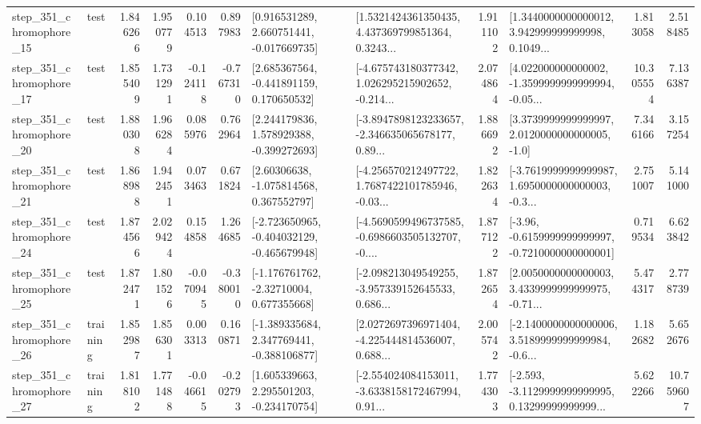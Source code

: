 \begin{tabular}{llrrrrllrlrr}
  step\_351\_chromophore\_15 &      test &      1.846266 &    1.950779 &      0.104513 &  0.897983 &    [0.916531289, 2.660751441, -0.017669735] &  [1.5321424361350435, 4.437369799851364, 0.3243... &       1.911102 &  [1.3440000000000012, 3.942999999999998, 0.1049... &            1.813058 &          2.518485 \\
  step\_351\_chromophore\_17 &      test &      1.855409 &    1.731291 &     -0.124118 & -0.767310 &    [2.685367564, -0.441891159, 0.170650532] &  [-4.675743180377342, 1.026295215902652, -0.214... &       2.074864 &  [4.022000000000002, -1.3599999999999994, -0.05... &           10.305554 &          7.136387 \\
  step\_351\_chromophore\_20 &      test &      1.880308 &    1.966284 &      0.085976 &  0.762964 &    [2.244179836, 1.578929388, -0.399272693] &  [-3.8947898123233657, -2.346635065678177, 0.89... &       1.886692 &     [3.3739999999999997, 2.0120000000000005, -1.0] &            7.346166 &          3.157254 \\
  step\_351\_chromophore\_21 &      test &      1.868988 &    1.942451 &      0.073463 &  0.671824 &     [2.60306638, -1.075814568, 0.367552797] &  [-4.256570212497722, 1.7687422101785946, -0.03... &       1.822634 &  [-3.7619999999999987, 1.6950000000000003, -0.3... &            2.751007 &          5.141000 \\
  step\_351\_chromophore\_24 &      test &      1.874566 &    2.029424 &      0.154858 &  1.264685 &  [-2.723650965, -0.404032129, -0.465679948] &  [-4.5690599496737585, -0.6986603505132707, -0.... &       1.877122 &  [-3.96, -0.6159999999999997, -0.7210000000000001] &            0.719534 &          6.623842 \\
  step\_351\_chromophore\_25 &      test &      1.872471 &    1.801526 &     -0.070945 & -0.380010 &    [-1.176761762, -2.32710004, 0.677355668] &  [-2.098213049549255, -3.957339152645533, 0.686... &       1.872654 &  [2.0050000000000003, 3.4339999999999975, -0.71... &            5.474317 &          2.778739 \\
  step\_351\_chromophore\_26 &  training &      1.852987 &    1.856301 &      0.003313 &  0.160871 &   [-1.389335684, 2.347769441, -0.388106877] &  [2.0272697396971404, -4.225444814536007, 0.688... &       2.005742 &  [-2.1400000000000006, 3.5189999999999984, -0.6... &            1.182682 &          5.652676 \\
  step\_351\_chromophore\_27 &  training &      1.818102 &    1.771488 &     -0.046615 & -0.202793 &    [1.605339663, 2.295501203, -0.234170754] &  [-2.554024084153011, -3.6338158172467994, 0.91... &       1.774303 &  [-2.593, -3.1129999999999995, 0.13299999999999... &            5.622266 &         10.759607 \\

\end{tabular}

